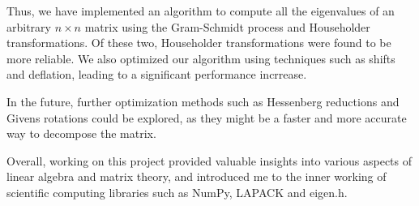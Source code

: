 \documentclass{article}
\begin{document}
Thus, we have implemented an algorithm to compute all the eigenvalues of
an arbitrary $n \times n$ matrix using the Gram-Schmidt process and
Householder transformations. Of these two, Householder transformations were found
to be more reliable. We also optimized our algorithm using techniques such as
shifts and deflation, leading to a significant performance incrrease.

In the future, further optimization methods such as Hessenberg reductions and
Givens rotations could be explored, as they might be a faster and more accurate way to
decompose the matrix.

Overall, working on this project provided valuable insights into various
aspects of linear algebra and matrix theory, and introduced me to the
inner working of scientific computing libraries such as NumPy, LAPACK
and eigen.h.

\nocite{*}
\printbibliography
\end{document}

